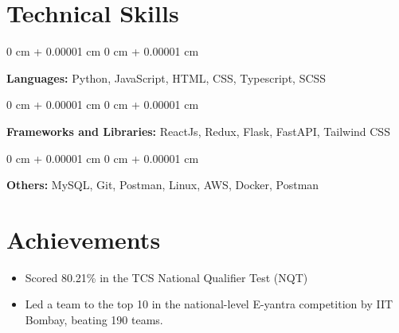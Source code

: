 \documentclass[10pt, letterpaper]{article}
\newenvironment{highlightsforbulletentries}{
    \begin{itemize}[
        topsep=0.10 cm,
        parsep=0.10 cm,
        partopsep=0pt,
        itemsep=0pt,
        leftmargin=10pt
    ]
}{
    \end{itemize}
} %
\newenvironment{onecolentry}{
    \begin{adjustwidth}{
        0 cm + 0.00001 cm
    }{
        0 cm + 0.00001 cm
    }
}{
    \end{adjustwidth}
} %
\begin{document}





    \section{Technical Skills}
        
        \begin{onecolentry}
            \textbf{Languages:} Python, JavaScript, HTML, CSS, Typescript, SCSS
        \end{onecolentry}

        \vspace{0.2 cm}

        \begin{onecolentry}
            \textbf{Frameworks and Libraries:} ReactJs, Redux, Flask, FastAPI, Tailwind CSS
        \end{onecolentry}

        \vspace{0.2 cm}

        \begin{onecolentry}
            \textbf{Others:} MySQL, Git, Postman, Linux, AWS, Docker, Postman
        \end{onecolentry}

        \vspace{0.2 cm}

    
    \section{Achievements}
  
        \begin{highlightsforbulletentries}
            \item Scored 80.21\% in the TCS National Qualifier Test (NQT)
            \item Led a team to the top 10 in the national-level E-yantra competition by IIT Bombay, beating 190 teams.
        \end{highlightsforbulletentries}
\end{document}
